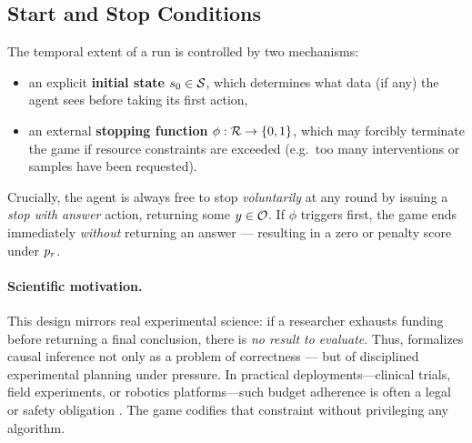 \subsection{Start and Stop Conditions}
The temporal extent of a run is controlled by two mechanisms:

\begin{itemize}
    \item an explicit \textbf{initial state} $\initstate \in \statespace$, which determines what data (if any) the agent sees before taking its first action,
    \item an external \textbf{stopping function} $\phi : \runs \to \{0,1\}$, which may forcibly terminate the game if resource constraints are exceeded (e.g.\ too many interventions or samples have been requested).
\end{itemize}

Crucially, the agent is always free to stop \emph{voluntarily} at any round by issuing a \emph{stop with answer} action, returning some $y \in \outputspace$. If $\phi$ triggers first, the game ends immediately \emph{without} returning an answer — resulting in a zero or penalty score under $p_r$.

\paragraph{Scientific motivation.}
This design mirrors real experimental science:  
if a researcher exhausts funding before returning a final conclusion, there is \emph{no result to evaluate}.  
Thus, \game formalizes causal inference not only as a problem of correctness — but of disciplined experimental planning under pressure.
In practical deployments—clinical trials, field experiments, or robotics platforms—such budget adherence is often a legal or safety obligation \citep{Prosperi2020CausalIAA,chengcausaltime}. The game codifies that constraint without privileging any algorithm.


